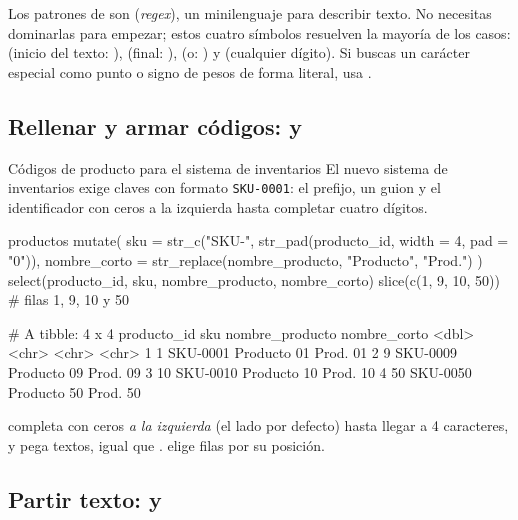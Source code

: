\begin{consejo}
Los patrones de  son 
(\emph{regex}), un minilenguaje para describir texto. No necesitas dominarlas
para empezar; estos cuatro símbolos resuelven la mayoría de los casos:
\codigo{\textasciicircum{}} (inicio del texto: ),
\codigo{\$} (final: ), \codigo{|} (o:
) y \codigo{[0-9]} (cualquier dígito). Si buscas un
carácter especial como punto o signo de pesos de forma literal, usa
.
\end{consejo}

\subsection{Rellenar y armar códigos: \texorpdfstring{}{str\_pad()} y \texorpdfstring{}{str\_c()}}

\begin{ejemplo}{Códigos de producto para el sistema de inventarios}
El nuevo sistema de inventarios exige claves con formato
\texttt{SKU-0001}: el prefijo, un guion y el identificador con ceros a la
izquierda hasta completar cuatro dígitos.
\end{ejemplo}

\begin{rcode}
productos %
  mutate(
    sku = str_c("SKU-", str_pad(producto_id, width = 4, pad = "0")),
    nombre_corto = str_replace(nombre_producto, "Producto", "Prod.")
  ) %
  select(producto_id, sku, nombre_producto, nombre_corto) %
  slice(c(1, 9, 10, 50))                  # filas 1, 9, 10 y 50
\end{rcode}
\begin{rsalida}
# A tibble: 4 x 4
  producto_id sku      nombre_producto nombre_corto
        <dbl> <chr>    <chr>           <chr>       
1           1 SKU-0001 Producto 01     Prod. 01    
2           9 SKU-0009 Producto 09     Prod. 09    
3          10 SKU-0010 Producto 10     Prod. 10    
4          50 SKU-0050 Producto 50     Prod. 50    
\end{rsalida}

 completa con ceros \emph{a la
izquierda} (el lado por defecto) hasta llegar a 4 caracteres, y
 pega textos, igual que . 
elige filas por su posición.

\subsection{Partir texto: \texorpdfstring{}{str\_split()} y \texorpdfstring{}{separate\_wider\_delim()}}


